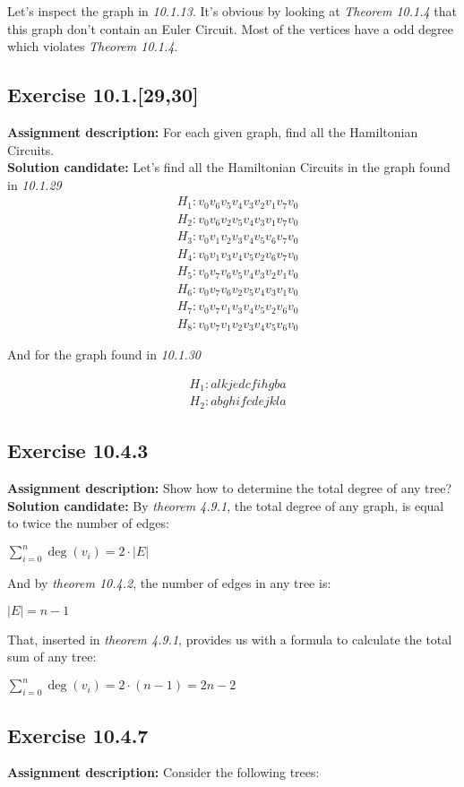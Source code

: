 \documentclass{report}
\newcommand{\cent}[1]{\begin{center}#1\end{center}}
\newcommand{\mAlign}[1]{\begin{align*}#1\end{align*}}
\newcommand{\assignmentDescription}{\textbf{Assignment description: }}
\newcommand{\solution}{\textbf{Solution candidate: }}
\newcommand{\Exercise}[1]{\subsection{Exercise #1}}
\begin{document}
	Let's inspect the graph in \textit{10.1.13}. It's obvious by looking at \textit{Theorem 10.1.4} that this graph don't contain an Euler Circuit. Most of the vertices have a odd degree which violates \textit{Theorem 10.1.4}.
	
	\Exercise{10.1.[29,30]}
	
	\assignmentDescription
	For each given graph, find all the Hamiltonian Circuits.\\
	
	\solution
	Let's find all the Hamiltonian Circuits in the graph found in \textit{10.1.29}
	\mAlign{&H_1 : v_0 v_6 v_5 v_4 v_3 v_2 v_1 v_7 v_0 \\
				 &H_2 : v_0 v_6 v_2 v_5 v_4 v_3 v_1 v_7 v_0 \\
			 	&H_3 : v_0 v_1 v_2 v_3 v_4 v_5 v_6 v_7 v_0 \\
		 		&H_4 : v_0 v_1 v_3 v_4 v_5 v_2 v_6 v_7 v_0 \\
	 		  	&H_5 : v_0 v_7 v_6 v_5 v_4 v_3 v_2 v_1 v_0 \\
	 		  	&H_6 : v_0 v_7 v_6 v_2 v_5 v_4 v_3 v_1 v_0 \\
	 		  	&H_7 : v_0 v_7 v_1 v_3 v_4 v_5 v_2 v_6 v_0 \\
	 		  	&H_8 : v_0 v_7 v_1 v_2 v_3 v_4 v_5 v_6 v_0}
  	
  	And for the graph found in \textit{10.1.30}
 	
 	\mAlign{&H_1 : a l k j e d c f i h g b a \\
 				  &H_2 : a b g h i f c d e j k l a}
	
	\Exercise{10.4.3}
	
	\assignmentDescription
	Show how to determine the total degree of any tree?\\
	
	\solution
	By \textit{theorem 4.9.1}, the total degree of any graph, is equal to twice the number of edges:
	
	\cent{$\sum_{i = 0}^{n} \deg(v_i) = 2 \cdot |E|$}
	
	And by \textit{theorem 10.4.2}, the number of edges in any tree is:
	
	\cent{$|E| = n-1$}
	
	That, inserted in \textit{theorem 4.9.1}, provides us with a formula to calculate the total sum of any tree:
	
	\cent{$\sum_{i = 0}^{n} \deg(v_i) = 2 \cdot (n-1) = 2n-2$}
	
	\Exercise{10.4.7}
	\assignmentDescription
	Consider the following trees:
	
\end{document}
